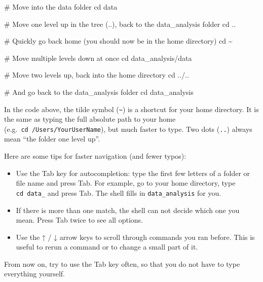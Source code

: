 \documentclass[
  letterpaper,
  DIV=11,
  numbers=noendperiod]{scrreprt}
\newenvironment{Shaded}{}{}
\newcommand{\BuiltInTok}[1]{\textcolor[rgb]{0.84,0.23,0.29}{#1}}
\newcommand{\CommentTok}[1]{\textcolor[rgb]{0.42,0.45,0.49}{#1}}
\newcommand{\NormalTok}[1]{\textcolor[rgb]{0.14,0.16,0.18}{#1}}
\providecommand{\tightlist}{%
  \setlength{\itemsep}{0pt}\setlength{\parskip}{0pt}}
\begin{document}
\begin{Shaded}
\begin{Highlighting}[]
\CommentTok{\# Move into the data folder}
\BuiltInTok{cd}\NormalTok{ data}

\CommentTok{\# Move one level up in the tree (..), back to the data\_analysis folder}
\BuiltInTok{cd}\NormalTok{ ..}

\CommentTok{\# Quickly go back home (you should now be in the home directory)}
\BuiltInTok{cd}\NormalTok{ \textasciitilde{}}

\CommentTok{\# Move multiple levels down at once}
\BuiltInTok{cd}\NormalTok{ data\_analysis/data}

\CommentTok{\# Move two levels up, back into the home directory}
\BuiltInTok{cd}\NormalTok{ ../..}

\CommentTok{\# And go back to the data\_analysis folder}
\BuiltInTok{cd}\NormalTok{ data\_analysis}
\end{Highlighting}
\end{Shaded}

In the code above, the tilde symbol (\texttt{\textasciitilde{}}) is a
shortcut for your home directory. It is the same as typing the full
absolute path to your home (e.g.~\texttt{cd\ /Users/YourUserName}), but
much faster to type. Two dots (\texttt{..}) always mean ``the folder one
level up''.

\begin{tcolorbox}[enhanced jigsaw, coltitle=black, breakable, titlerule=0mm, colback=white, rightrule=.15mm, bottomrule=.15mm, toprule=.15mm, colframe=quarto-callout-tip-color-frame, colbacktitle=quarto-callout-tip-color!10!white, bottomtitle=1mm, opacitybacktitle=0.6, toptitle=1mm, leftrule=.75mm, arc=.35mm, title=\textcolor{quarto-callout-tip-color}{\faLightbulb}\hspace{0.5em}{Tip: Command-line completion}, left=2mm, opacityback=0]

Here are some tips for faster navigation (and fewer typos):

\begin{itemize}
\tightlist
\item
  Use the Tab key for autocompletion: type the first few letters of a
  folder or file name and press Tab. For example, go to your home
  directory, type \texttt{cd\ data\_} and press Tab. The shell fills in
  \texttt{data\_analysis} for you.
\item
  If there is more than one match, the shell can not decide which one
  you mean. Press Tab twice to see all options.
\item
  Use the ↑ / ↓ arrow keys to scroll through commands you ran before.
  This is useful to rerun a command or to change a small part of it.
\end{itemize}

From now on, try to use the Tab key often, so that you do not have to
type everything yourself.

\end{tcolorbox}
\end{document}
